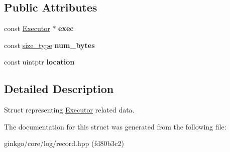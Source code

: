 \subsection*{Public Attributes}
\begin{DoxyCompactItemize}
\item 
\mbox{\label{structgko_1_1log_1_1executor__data_af2abfc8622da8be8466de15db9c15f82}} 
const \hyperlink{classgko_1_1Executor}{Executor} $\ast$ {\bfseries exec}
\item 
\mbox{\label{structgko_1_1log_1_1executor__data_ae163391b85c824367dd0c7e4771ac8c9}} 
const \hyperlink{namespacegko_a6e5c95df0ae4e47aab2f604a22d98ee7}{size\+\_\+type} {\bfseries num\+\_\+bytes}
\item 
\mbox{\label{structgko_1_1log_1_1executor__data_a5ff784e87bb40d732118a9bd77457ebe}} 
const uintptr {\bfseries location}
\end{DoxyCompactItemize}


\subsection{Detailed Description}
Struct representing \hyperlink{classgko_1_1Executor}{Executor} related data. 



The documentation for this struct was generated from the following file\+:\begin{DoxyCompactItemize}
\item 
ginkgo/core/log/record.\+hpp (fd80b3c2)\end{DoxyCompactItemize}
